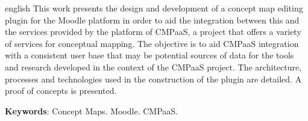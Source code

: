 \documentclass[
	12pt,				%
	openright,			%
	oneside,			%
	a4paper,			%
	english,			%
	french,				%
	spanish,			%
	brazil				%
	]{abntex2}
\begin{document}
\begin{resumo}[Abstract]
  \begin{otherlanguage*}{english}
    This work presents the design and development of a concept map editing plugin for the Moodle platform in order to aid the integration between this and the services provided by the platform of CMPaaS, a project that offers a variety of services for conceptual mapping. 
    The objective is to aid CMPaaS integration with a consistent user base that may be potential
    sources of data for the tools and research developed in the context of the CMPaaS project.
    The architecture, processes and technologies used in the construction of the plugin are detailed. A proof of concepts is presented.
    
    \vspace{\onelineskip}
 
    \noindent 
    \textbf{Keywords}: Concept Maps. Moodle. CMPaaS.
  \end{otherlanguage*}
\end{resumo}


\listoffigures*
\cleardoublepage




\tableofcontents*
\cleardoublepage



\textual
\end{document}
